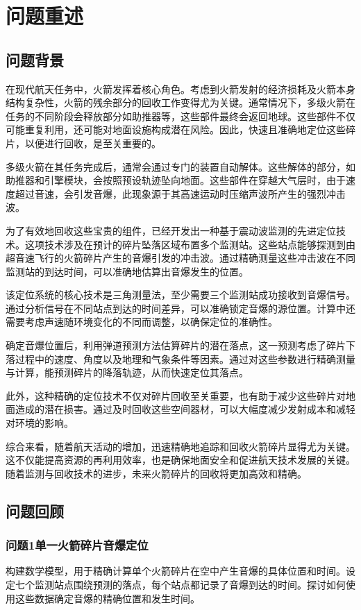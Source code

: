 \documentclass[withoutpreface,bwprint,12pt,a4paper]{cumcmthesis}
\begin{document}

\section{问题重述}

\subsection{问题背景}
在现代航天任务中，火箭发挥着核心角色。考虑到火箭发射的经济损耗及火箭本身结构复杂性，火箭的残余部分的回收工作变得尤为关键。通常情况下，多级火箭在任务的不同阶段会释放部分如助推器等，这些部件最终会返回地球。这些部件不仅可能重复利用，还可能对地面设施构成潜在风险。因此，快速且准确地定位这些碎片，以便进行回收，是至关重要的。

多级火箭在其任务完成后，通常会通过专门的装置自动解体。这些解体的部分，如助推器和引擎模块，会按照预设轨迹坠向地面。这些部件在穿越大气层时，由于速度超过音速，会引发音爆，此现象源于其高速运动时压缩声波所产生的强烈冲击波。

为了有效地回收这些宝贵的组件，已经开发出一种基于震动波监测的先进定位技术。这项技术涉及在预计的碎片坠落区域布置多个监测站。这些站点能够探测到由超音速飞行的火箭碎片产生的音爆引发的冲击波。通过精确测量这些冲击波在不同监测站的到达时间，可以准确地估算出音爆发生的位置。

该定位系统的核心技术是三角测量法，至少需要三个监测站成功接收到音爆信号。通过分析信号在不同站点到达的时间差异，可以准确锁定音爆的源位置。计算中还需要考虑声速随环境变化的不同而调整，以确保定位的准确性。

确定音爆位置后，利用弹道预测方法估算碎片的潜在落点，这一预测考虑了碎片下落过程中的速度、角度以及地理和气象条件等因素。通过对这些参数进行精确测量与计算，能预测碎片的降落轨迹，从而快速定位其落点。

此外，这种精确的定位技术不仅对碎片回收至关重要，也有助于减少这些碎片对地面造成的潜在损害。通过及时回收这些空间器材，可以大幅度减少发射成本和减轻对环境的影响。

综合来看，随着航天活动的增加，迅速精确地追踪和回收火箭碎片显得尤为关键。这不仅能提高资源的再利用效率，也是确保地面安全和促进航天技术发展的关键。随着监测与回收技术的进步，未来火箭碎片的回收将更加高效和精确。

\subsection{问题回顾}

\subsubsection{问题1单一火箭碎片音爆定位}
构建数学模型，用于精确计算单个火箭碎片在空中产生音爆的具体位置和时间。设定七个监测站点围绕预测的落点，每个站点都记录了音爆到达的时间。探讨如何使用这些数据确定音爆的精确位置和发生时间。
\end{document}
